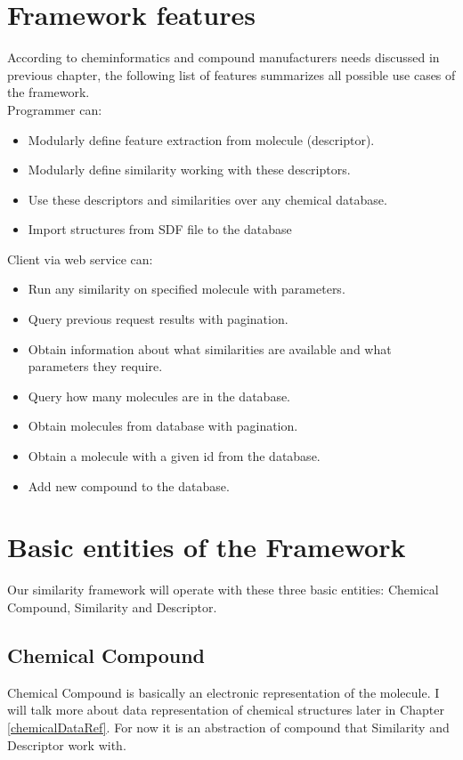 \documentclass[thesis=M,english]{FITthesis}[2012/10/20]
\begin{document}
\section{Framework features}
According to cheminformatics and compound manufacturers needs discussed in previous chapter, the following list of features summarizes all possible use cases of the framework.\\
Programmer can:
\begin{itemize}
\item Modularly define feature extraction from molecule (descriptor).
\item Modularly define similarity working with these descriptors.
\item Use these descriptors and similarities over any chemical database.
\item Import structures from SDF file to the database
\end{itemize}
Client via web service can:
\begin{itemize}
\item Run any similarity on specified molecule with parameters.
\item Query previous request results with pagination.
\item Obtain information about what similarities are available and what parameters they require.
\item Query how many molecules are in the database.
\item Obtain molecules from database with pagination.
\item Obtain a molecule with a given id from the database.
\item Add new compound to the database.
\end{itemize}


\section{Basic entities of the Framework}
Our similarity framework will operate with these three basic entities: Chemical Compound, Similarity and Descriptor.

\subsection{Chemical Compound}
Chemical Compound is basically an electronic representation of the molecule. I will talk more about data representation of chemical structures later in Chapter \ref{chemicalDataRef}. For now it is an abstraction of compound that Similarity and Descriptor work with. 
\end{document}
